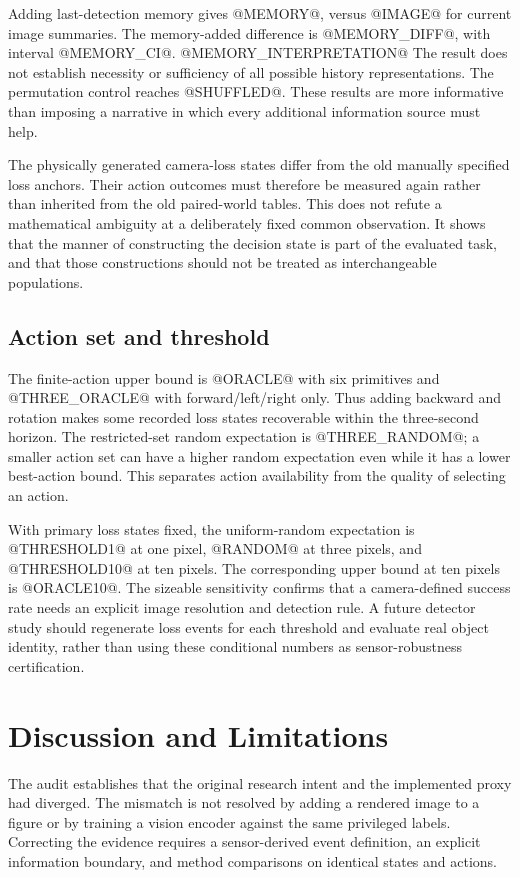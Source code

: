 \documentclass[10pt,twocolumn,a4paper]{article}
\begin{document}
Adding last-detection memory gives @MEMORY@, versus @IMAGE@ for current image summaries. The memory-added difference is @MEMORY_DIFF@, with interval @MEMORY_CI@. @MEMORY_INTERPRETATION@ The result does not establish necessity or sufficiency of all possible history representations. The permutation control reaches @SHUFFLED@. These results are more informative than imposing a narrative in which every additional information source must help.

The physically generated camera-loss states differ from the old manually specified loss anchors. Their action outcomes must therefore be measured again rather than inherited from the old paired-world tables. This does not refute a mathematical ambiguity at a deliberately fixed common observation. It shows that the manner of constructing the decision state is part of the evaluated task, and that those constructions should not be treated as interchangeable populations.

\subsection{Action set and threshold}
The finite-action upper bound is @ORACLE@ with six primitives and @THREE_ORACLE@ with forward/left/right only. Thus adding backward and rotation makes some recorded loss states recoverable within the three-second horizon. The restricted-set random expectation is @THREE_RANDOM@; a smaller action set can have a higher random expectation even while it has a lower best-action bound. This separates action availability from the quality of selecting an action.

With primary loss states fixed, the uniform-random expectation is @THRESHOLD1@ at one pixel, @RANDOM@ at three pixels, and @THRESHOLD10@ at ten pixels. The corresponding upper bound at ten pixels is @ORACLE10@. The sizeable sensitivity confirms that a camera-defined success rate needs an explicit image resolution and detection rule. A future detector study should regenerate loss events for each threshold and evaluate real object identity, rather than using these conditional numbers as sensor-robustness certification.

\section{Discussion and Limitations}
The audit establishes that the original research intent and the implemented proxy had diverged. The mismatch is not resolved by adding a rendered image to a figure or by training a vision encoder against the same privileged labels. Correcting the evidence requires a sensor-derived event definition, an explicit information boundary, and method comparisons on identical states and actions.
\end{document}
